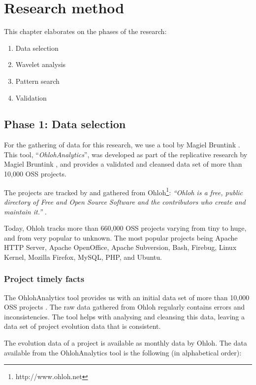 \chapter{Research method}
\label{method}

This chapter elaborates on the phases of the research:
\begin{enumerate}
	\item Data selection
	\item Wavelet analysis
	\item Pattern search
	\item Validation
\end{enumerate}

\section{Phase 1: Data selection}
For the gathering of data for this research, we use a tool by Magiel Bruntink
\cite{ohlohanalytics}. This tool, ``\emph{OhlohAnalytics}\rm'', was developed as
part of the replicative research by Magiel Bruntink \cite{bruntink2014}, and
provides a validated and cleansed data set of more than 10,000 OSS projects.

The projects are tracked by and gathered from
Ohloh\footnote{http://www.ohloh.net}: \emph{``Ohloh is a free, public directory
of Free and Open Source Software and the contributors who create and maintain
it.'' }\rm \cite{ohloh}.

Today, Ohloh tracks more than 660,000 OSS projects varying from tiny to huge,
and from very popular to unknown. The most popular projects being Apache HTTP
Server, Apache OpenOffice, Apache Subversion, Bash, Firebug, Linux Kernel,
Mozilla Firefox, MySQL, PHP, and Ubuntu.

\subsection{Project timely facts}
The OhlohAnalytics tool provides us with an initial data set of more than
10,000 OSS projects \cite{bruntink2014}. The raw data gathered from Ohloh
regularly contains errors and inconsistencies. The tool helps with analysing
and cleansing this data, leaving a data set of project evolution data that is
consistent.

The evolution data of a project is available as monthly data by Ohloh. The
data available from the OhlohAnalytics tool is the following (in alphabetical
order):

